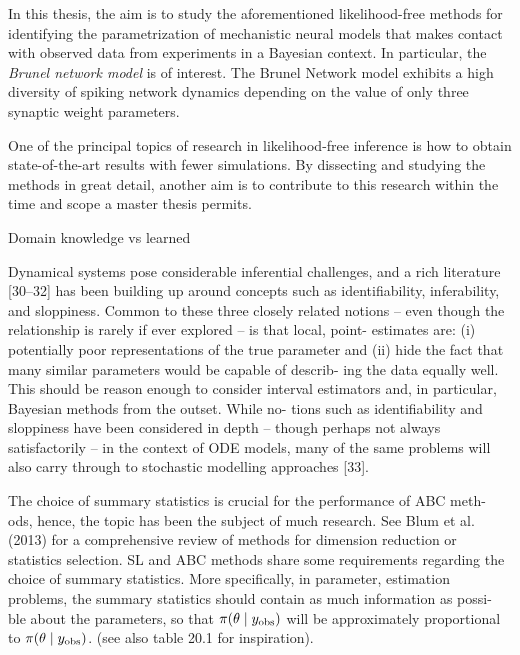 In this thesis, the aim is to study the aforementioned likelihood-free methods for identifying the parametrization of mechanistic neural models that makes contact with observed data from experiments in a Bayesian context. In particular, the \textit{Brunel network model} is of interest. The Brunel Network model exhibits a high diversity of spiking network dynamics depending on the value of only three synaptic weight parameters.

One of the principal topics of research in likelihood-free inference is how to obtain state-of-the-art results with fewer simulations. By dissecting and studying the methods in great detail, another aim is to contribute to this research within the time and scope a master thesis permits. 


Domain knowledge vs learned


Dynamical systems pose considerable inferential challenges, and a rich literature [30–32] has been building up around concepts such as identifiability, inferability, and sloppiness. Common to these three closely related notions – even though the relationship is rarely if ever explored – is that local, point- estimates are: (i) potentially poor representations of the true parameter and (ii) hide the fact that many similar parameters would be capable of describ- ing the data equally well. This should be reason enough to consider interval estimators and, in particular, Bayesian methods from the outset. While no- tions such as identifiability and sloppiness have been considered in depth – though perhaps not always satisfactorily – in the context of ODE models, many of the same problems will also carry through to stochastic modelling approaches [33]. \cite{ABC_ch17} 


The choice of summary statistics is crucial for the performance of ABC meth- ods, hence, the topic has been the subject of much research. See Blum et al. (2013) for a comprehensive review of methods for dimension reduction or statistics selection. SL and ABC methods share some requirements regarding the choice of summary statistics. More specifically, in parameter, estimation problems, the summary statistics should contain as much information as possi- ble about the parameters, so that $\pi \qty(\theta \mid y_\mathrm{obs})$ will be approximately proportional to $\pi \qty(\theta \mid y_\mathrm{obs})$. \cite{ABC_ch20} (see also table 20.1 for inspiration).